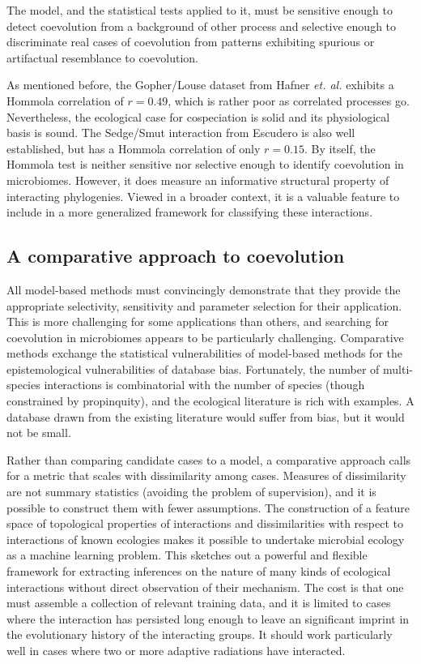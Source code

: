 The model, and the statistical tests applied to it, must be sensitive enough to detect coevolution from a background of other process and selective enough to discriminate real cases of coevolution from patterns exhibiting spurious or artifactual resemblance to coevolution.

As mentioned before, the Gopher/Louse dataset from Hafner {\em et. al.} exhibits a Hommola correlation of $r=0.49$, which is rather poor as correlated processes go. Nevertheless, the ecological case for cospeciation is solid and its physiological basis is sound. The Sedge/Smut interaction from Escudero \cite{escudero2015phylogenetic} is also well established, but has a Hommola correlation of only $r=0.15$. By itself, the Hommola test is neither sensitive nor selective enough to identify coevolution in microbiomes. However, it does measure an informative structural property of interacting phylogenies. Viewed in a broader context, it is a valuable feature to include in a more generalized framework for classifying these interactions.

\subsection{A comparative approach to coevolution}

All model-based methods must convincingly demonstrate that they provide the appropriate selectivity, sensitivity and parameter selection for their application. This is more challenging for some applications than others, and searching for coevolution in microbiomes appears to be particularly challenging. Comparative methods exchange the statistical vulnerabilities of model-based methods for the epistemological vulnerabilities of database bias. Fortunately, the number of multi-species interactions is combinatorial with the number of species (though constrained by propinquity), and the ecological literature is rich with examples. A database drawn from the existing literature would suffer from bias, but it would not be small.

Rather than comparing candidate cases to a model, a comparative approach calls for a metric that scales with dissimilarity among cases. Measures of dissimilarity are not summary statistics (avoiding the problem of supervision), and it is possible to construct them with fewer assumptions. The construction of a feature space of topological properties of interactions and dissimilarities with respect to interactions of known ecologies makes it possible to undertake microbial ecology as a machine learning problem. This sketches out a powerful and flexible framework for extracting inferences on the nature of many kinds of ecological interactions without direct observation of their mechanism. The cost is that one must assemble a collection of relevant training data, and it is limited to cases where the interaction has persisted long enough to leave an significant imprint in the evolutionary history of the interacting groups. It should work particularly well in cases where two or more adaptive radiations have interacted.

